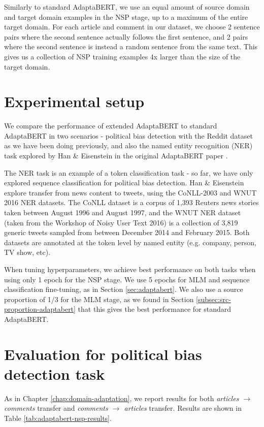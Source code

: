 Similarly to standard AdaptaBERT, we use an equal amount of source domain and target domain examples in the NSP stage, up to a maximum of the entire target domain. For each article and comment in our dataset, we choose 2 sentence pairs where the second sentence actually follows the first sentence, and 2 pairs where the second sentence is instead a random sentence from the same text. This gives us a collection of NSP training examples 4x larger than the size of the target domain.

\section{Experimental setup}

We compare the performance of extended AdaptaBERT to standard AdaptaBERT in two scenarios - political bias detection with the Reddit dataset as we have been doing previously, and also the named entity recognition (NER) task explored by Han \& Eisenstein in the original AdaptaBERT paper \cite{adaptabert}.

The NER task is an example of a token classification task - so far, we have only explored sequence classification for political bias detection. Han \& Eisenstein explore transfer from news content to tweets, using the CoNLL-2003 and WNUT 2016 NER datasets. The CoNLL dataset \cite{conll} is a corpus of 1,393 Reuters news stories \cite{reuters} taken between August 1996 and August 1997, and the WNUT NER dataset \cite{wnut} (taken from the Workshop of Noisy User Text 2016) is a collection of 3,819 generic tweets sampled from between December 2014 and February 2015. Both datasets are annotated at the token level by named entity (e.g. company, person, TV show, etc).

When tuning hyperparameters, we achieve best performance on both tasks when using only 1 epoch for the NSP stage. We use 5 epochs for MLM and sequence classification fine-tuning, as in Section \ref{sec:adaptabert}. We also use a source proportion of 1/3 for the MLM stage, as we found in Section \ref{subsec:src-proportion-adaptabert} that this gives the best performance for standard AdaptaBERT.

\section{Evaluation for political bias detection task} \label{sec:nsp-evaluation-political-bias}

As in Chapter \ref{chap:domain-adaptation}, we report results for both \textit{articles $ \rightarrow $ comments} transfer and \textit{comments $ \rightarrow $ articles} transfer. Results are shown in Table \ref{tab:adaptabert-nsp-results}.

